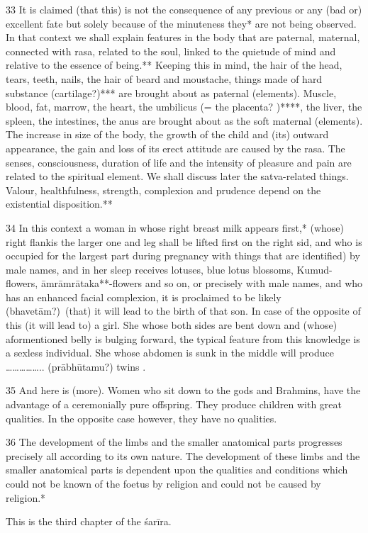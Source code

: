 \begin{translation}
\begin{tt}
\item[33] It is claimed (that this) is not the consequence of any previous or any 
(bad or) excellent fate but solely because of the minuteness  they* are not being 
observed. In that context we shall explain features in the body that are paternal, 
maternal, connected with rasa, related to the soul, linked to the quietude of mind 
and relative to the essence of being.** Keeping this in mind, the hair of the head, 
tears, teeth, nails, the hair of beard and moustache, things made of hard 
substance (cartilage?)*** are brought about as paternal (elements). Muscle, 
blood, fat, marrow, the heart, the umbilicus (= the placenta? )****, the liver, the 
spleen, the intestines, the anus are brought about as the soft maternal 
(elements). The increase in size of the body, the growth of the child and (its) 
outward appearance, the gain and loss of its erect attitude are caused by the 
rasa. The senses, consciousness, duration of life and the intensity of pleasure 
and pain are related to the spiritual element. We shall discuss later the 
satva-related things. Valour, healthfulness, strength, complexion and prudence 
depend on the existential disposition.**

\item[34] In this context a woman in whose right breast  milk appears first,* 
(whose) right flankis the larger one  and leg shall be lifted first on the right sid, 
and  who is occupied for the largest part during pregnancy with things that are 
identified) by male names, and in her sleep receives lotuses, blue lotus 
blossoms, Kumud-flowers, āmrāmrātaka**-flowers and so on, or precisely with 
male names, and who has an enhanced facial complexion, it is proclaimed to be 
likely (bhavetām?) (that) it will lead to the birth of that son. In case of the 
opposite of this (it will lead to) a girl. She whose both sides are bent down and 
(whose) aformentioned  belly is bulging  forward, the typical feature from this 
knowledge is a sexless individual. She whose abdomen is sunk in the middle will 
produce  …………….. (prābhūtamu?) twins . 

\item[35]And here is (more). Women who sit down to the gods and Brahmins, 
have the advantage of a ceremonially pure offspring. They produce children with 
great qualities. In the opposite case however, they have no qualities. 

\item[36] The development of the limbs and the smaller anatomical parts  
progresses  precisely all according to its own nature. The development of these 
limbs and the smaller anatomical parts is dependent upon the qualities and 
conditions which could not be known of the foetus by religion and could not be 
caused by religion.*

This is the third chapter of the śarīra.

\end{tt}
    
\end{translation}
